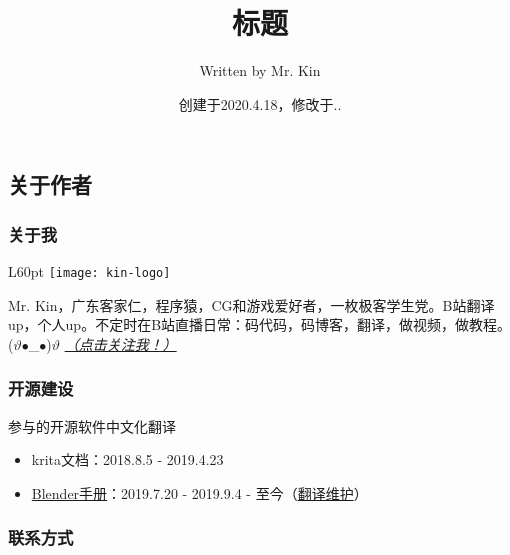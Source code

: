 \documentclass[11pt,a4paper,UTF8,titlepage]{ctexrep} %
\title{\hypertarget{title}{\textbf{标题}}}
\author{Written by Mr. Kin}
\date{创建于2020.4.18，修改于\number\year.\number\month.\number\day}
\makeatletter
\renewcommand{\tableofcontents}%
  {\chapter{\contentsname}%
  \@mkboth{\MakeUppercase\contentsname}{\MakeUppercase\contentsname}%
  \@makeschapterhead{\sourcecodename}%
  \@starttoc{toc}%
}
\makeatother
\begin{document}
    \maketitle %
    {\centering \tableofcontents} %
    \clearpage %
    \fi

    \section*{\bfseries \sffamily 关于作者}

    \subsection*{\bfseries \sffamily 关于我}
    \begin{wrapfigure}[3]{L}{60pt}
        \vspace*{-20pt}
        \centering
        \texttt{[image: kin-logo]}
    \end{wrapfigure}
    Mr. Kin，广东客家仁，程序猿，CG和游戏爱好者，一枚极客学生党。B站翻译up，个人up。不定时在B站直播日常：码代码，码博客，翻译，做视频，做教程。 ($\vartheta$$\bullet$\_$\bullet$)$\vartheta$ \hyperlink{follow}{\emph{（点击关注我！）}}

    \subsection*{\bfseries \sffamily 开源建设}

    \noindent 参与的开源软件中文化翻译

    \begin{itemize}
        \item krita文档：2018.8.5 - 2019.4.23
        \item \href{https://www.blendercn.org/5812.html?tdsourcetag=s_pctim_aiomsg}{Blender手册}：2019.7.20 - 2019.9.4 - 至今（\href{https://developer.blender.org/p/Mr_Kin/}{翻译维护}）
    \end{itemize}

    \subsection*{\bfseries \sffamily \hypertarget{contact}{联系方式}}
    \vspace*{-1ex}
\end{document}
